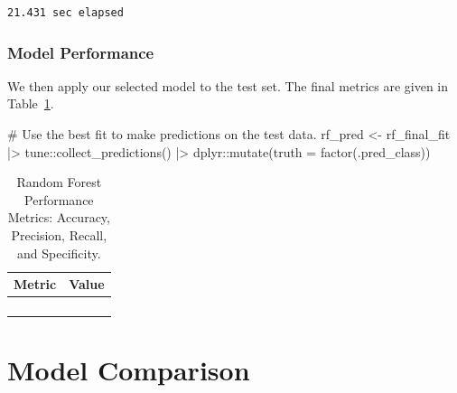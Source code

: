 \documentclass[
  letterpaper,
  DIV=11,
  numbers=noendperiod]{scrartcl}
\newenvironment{Shaded}{\begin{snugshade}}{\end{snugshade}}
\newcommand{\AttributeTok}[1]{\textcolor[rgb]{0.40,0.45,0.13}{#1}}
\newcommand{\CommentTok}[1]{\textcolor[rgb]{0.37,0.37,0.37}{#1}}
\newcommand{\FunctionTok}[1]{\textcolor[rgb]{0.28,0.35,0.67}{#1}}
\newcommand{\NormalTok}[1]{\textcolor[rgb]{0.00,0.23,0.31}{#1}}
\newcommand{\OtherTok}[1]{\textcolor[rgb]{0.00,0.23,0.31}{#1}}
\newcommand{\SpecialCharTok}[1]{\textcolor[rgb]{0.37,0.37,0.37}{#1}}
\begin{document}
\begin{verbatim}
21.431 sec elapsed
\end{verbatim}

\subsubsection{Model Performance}\label{model-performance-5}

We then apply our selected model to the test set. The final metrics are
given in Table~\ref{tbl-rf-performance-pdf}.

\begin{Shaded}
\begin{Highlighting}[]
\CommentTok{\# Use the best fit to make predictions on the test data.}
\NormalTok{rf\_pred }\OtherTok{\textless{}{-}} 
\NormalTok{  rf\_final\_fit }\SpecialCharTok{|\textgreater{}} 
\NormalTok{  tune}\SpecialCharTok{::}\FunctionTok{collect\_predictions}\NormalTok{() }\SpecialCharTok{|\textgreater{}}
\NormalTok{  dplyr}\SpecialCharTok{::}\FunctionTok{mutate}\NormalTok{(}\AttributeTok{truth =} \FunctionTok{factor}\NormalTok{(.pred\_class))}
\end{Highlighting}
\end{Shaded}

\begin{longtable}{>{\raggedright\arraybackslash}p{}>{\raggedleft\arraybackslash}p{}}

\caption{\label{tbl-rf-performance-pdf}Random Forest Performance
Metrics: Accuracy, Precision, Recall, and Specificity.}

\tabularnewline

\toprule
Metric & Value \\ 
\midrule\addlinespace[2.5pt]
\cellcolor[HTML]{FFFFFF}{Accuracy} & \cellcolor[HTML]{FFFFFF}{94.5} \\ 
\cellcolor[HTML]{FFFFFF}{Precision} & \cellcolor[HTML]{FFFFFF}{84.6} \\ 
\cellcolor[HTML]{FFFFFF}{Recall} & \cellcolor[HTML]{FFFFFF}{95.7} \\ 
\cellcolor[HTML]{FFFFFF}{Specificity} & \cellcolor[HTML]{FFFFFF}{94.1} \\ 
\bottomrule

\end{longtable}

\section{Model Comparison}\label{model-comparison}
\end{document}
